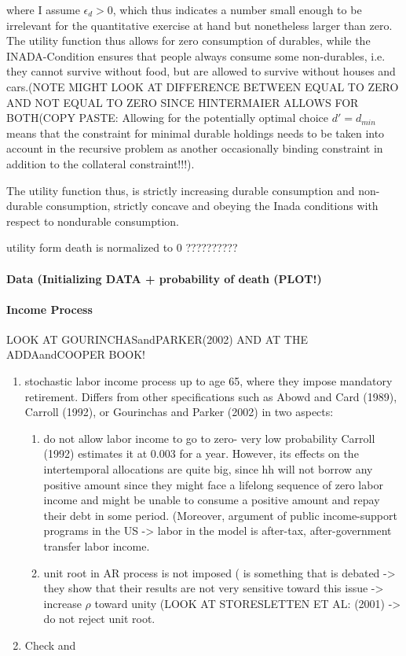 \documentclass[a4paper,12pt]{article}
\begin{document}
where I assume $\epsilon_{d} > 0$, which thus indicates a number small enough to be irrelevant for the quantitative exercise at hand but nonetheless larger than zero. The utility function thus allows for zero consumption of durables, while the INADA-Condition ensures that people always consume some non-durables, i.e. they cannot survive without food, but are allowed to survive without houses and cars.(NOTE MIGHT LOOK AT DIFFERENCE BETWEEN EQUAL TO ZERO AND NOT EQUAL TO ZERO SINCE HINTERMAIER ALLOWS FOR BOTH(COPY PASTE: Allowing for the potentially optimal choice $d' = d_{min}$ means that the constraint for minimal durable holdings needs to be taken into account in the recursive problem as another occasionally binding constraint in addition to the collateral constraint!!!). 

The utility function thus, is strictly increasing durable consumption and non-durable consumption, strictly concave and obeying the Inada conditions with respect to nondurable consumption. 

\citep{FV&K2011} utility form death is normalized to 0 ??????????

\paragraph{Data (Initializing DATA + probability of death (PLOT!)}

\paragraph{Income Process}

LOOK AT GOURINCHASandPARKER(2002) AND AT THE ADDAandCOOPER BOOK! 

\begin{enumerate}
\item \citep{FV&K2011} stochastic labor income process up to age 65, where they impose mandatory retirement. Differs from other specifications such as Abowd and Card (1989), Carroll (1992), or Gourinchas and Parker (2002) in two aspects: 
\begin{enumerate}
\item do not allow labor income to go to zero- very low probability Carroll (1992) estimates it at 0.003 for a year. However, its effects on the intertemporal allocations are quite big, since hh will not borrow any positive amount since they might face a lifelong sequence of zero labor income and might be unable to consume a positive amount and repay their debt in some period. (Moreover, argument of public income-support programs in the US -> labor in the model is after-tax, after-government transfer labor income.
\item unit root in AR process is not imposed  ( is something that is debated -> they show that their results are not very sensitive toward this issue -> increase $\rho$ toward unity (LOOK AT STORESLETTEN ET AL: (2001) -> do not reject unit root.
\end{enumerate} 
\item Check \cite{hintermaier2010} and \cite{hintermaier2011}
\end{enumerate}
\end{document}
